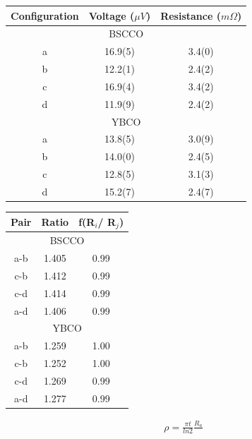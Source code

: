 \documentclass[
reprint,
amsmath,amssymb,
aps,
tikz,
border=5pt
]{revtex4-1}
\begin{document}
    \begin{center}
      \begin{tabular}{ |c|c|c| }
        \hline
        Configuration & Voltage ($\mu V$) & Resistance  ($m\Omega$) \\ 
        \hline
        \multicolumn{3}{|c|}{BSCCO} \\
        \hline
        a & 16.9(5) & 3.4(0)  \\ 
        \hline
        b & 12.2(1) & 2.4(2)  \\ 
        \hline
        c & 16.9(4) & 3.4(2)  \\ 
        \hline
        d & 11.9(9) & 2.4(2)  \\ 
        \hline
        \multicolumn{3}{|c|}{YBCO} \\
        \hline
        a & 13.8(5) & 3.0(9)  \\ 
        \hline
        b & 14.0(0) & 2.4(5)  \\ 
        \hline
        c & 12.8(5) & 3.1(3) \\ 
        \hline
        d & 15.2(7) & 2.4(7)  \\ 
        \hline
      \end{tabular}
    \end{center}
    
    \begin{center}
      \begin{tabular}{ |c|c|c| }
        \hline
        Pair & Ratio & f(R$_i$/ R$_j$) \\
        \hline
        \multicolumn{3}{|c|}{BSCCO} \\
        \hline
        a-b & 1.405 & 0.99 \\
        \hline
        c-b & 1.412 & 0.99 \\
        \hline
        c-d & 1.414 & 0.99 \\
        \hline
        a-d & 1.406 & 0.99 \\
        \hline
        \multicolumn{3}{|c|}{YBCO} \\
        \hline
        a-b & 1.259 & 1.00 \\
        \hline
        c-b & 1.252 & 1.00 \\
        \hline
        c-d & 1.269 & 0.99 \\
        \hline
        a-d & 1.277 & 0.99 \\
        \hline
      \end{tabular}
    \end{center}
    \begin{gather}
      \rho = \frac{\pi t}{ln2}\frac{R_a}{}
    \end{gather}
\end{document}
